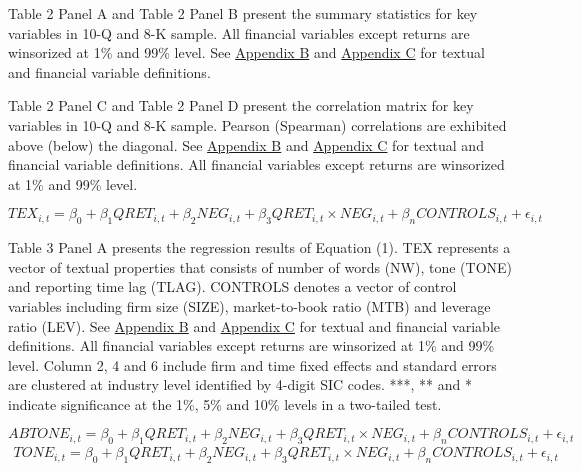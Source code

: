 
\newpage


Table 2 Panel A and Table 2 Panel B present the summary statistics for key variables in 10-Q and 8-K sample. All financial variables except returns are winsorized at 1\% and 99\% level. See \hyperref[appb]{Appendix B} and \hyperref[appc]{Appendix C} for textual and financial variable definitions.

\newpage
\begin{landscape}


Table 2 Panel C and Table 2 Panel D present the correlation matrix for key variables in 10-Q and 8-K sample. Pearson (Spearman) correlations are exhibited above (below) the diagonal. See \hyperref[appb]{Appendix B} and \hyperref[appc]{Appendix C} for textual and financial variable definitions. All financial variables except returns are winsorized at 1\% and 99\% level. 
\end{landscape}

\newpage

\setcounter{equation}{0}
\begin{equation}
TEX_{i,t}=\beta_0+\beta_1QRET_{i,t}+\beta_2NEG_{i,t}+\beta_3QRET_{i,t}\times NEG_{i,t}+\beta_nCONTROLS_{i,t}+\epsilon_{i,t}
\end{equation}

Table 3 Panel A presents the regression results of Equation (1). TEX represents a vector of textual properties that consists of number of words (NW), tone (TONE) and reporting time lag (TLAG). CONTROLS denotes a vector of control variables including firm size (SIZE), market-to-book ratio (MTB) and leverage ratio (LEV). See \hyperref[appb]{Appendix B} and \hyperref[appc]{Appendix C} for textual and financial variable definitions. All financial variables except returns are winsorized at 1\% and 99\% level. Column 2, 4 and 6 include firm and time fixed effects and standard errors are clustered at industry level identified by 4-digit SIC codes. ***, ** and * indicate significance at the 1\%, 5\% and 10\% levels in a two-tailed test.

\newpage

\setcounter{equation}{3}
\begin{equation}
ABTONE_{i,t}=\beta_0+\beta_1QRET_{i,t}+\beta_2NEG_{i,t}+\beta_3QRET_{i,t}\times NEG_{i,t}+\beta_nCONTROLS_{i,t}+\epsilon_{i,t}
\end{equation}
\begin{equation}
\begin{split}
TONE_{i,t}=\beta_0+\beta_1QRET_{i,t}+\beta_2NEG_{i,t}+\beta_3QRET_{i,t}\times NEG_{i,t}+\beta_nCONTROLS_{i,t}+\epsilon_{i,t}
\end{split}
\end{equation}

